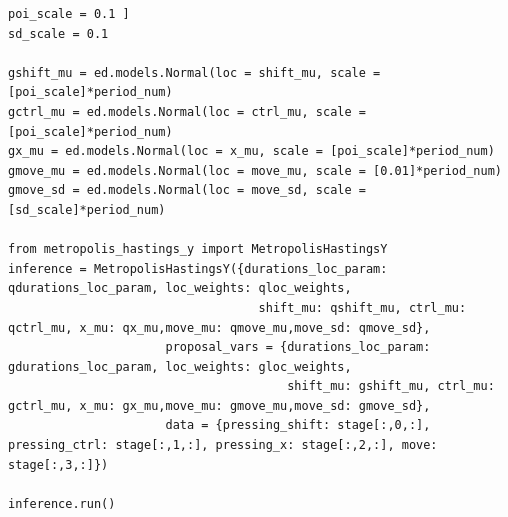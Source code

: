 \documentclass[UTF8]{ctexart}
\begin{document}
\begin{verbatim}
poi_scale = 0.1 ]
sd_scale = 0.1 

gshift_mu = ed.models.Normal(loc = shift_mu, scale = [poi_scale]*period_num)
gctrl_mu = ed.models.Normal(loc = ctrl_mu, scale = [poi_scale]*period_num)
gx_mu = ed.models.Normal(loc = x_mu, scale = [poi_scale]*period_num)
gmove_mu = ed.models.Normal(loc = move_mu, scale = [0.01]*period_num)
gmove_sd = ed.models.Normal(loc = move_sd, scale = [sd_scale]*period_num)

from metropolis_hastings_y import MetropolisHastingsY
inference = MetropolisHastingsY({durations_loc_param: qdurations_loc_param, loc_weights: qloc_weights,
                                   shift_mu: qshift_mu, ctrl_mu: qctrl_mu, x_mu: qx_mu,move_mu: qmove_mu,move_sd: qmove_sd},
                      proposal_vars = {durations_loc_param: gdurations_loc_param, loc_weights: gloc_weights,
                                       shift_mu: gshift_mu, ctrl_mu: gctrl_mu, x_mu: gx_mu,move_mu: gmove_mu,move_sd: gmove_sd},
                      data = {pressing_shift: stage[:,0,:], pressing_ctrl: stage[:,1,:], pressing_x: stage[:,2,:], move: stage[:,3,:]})
					  
inference.run()

\end{verbatim}
\end{document}
